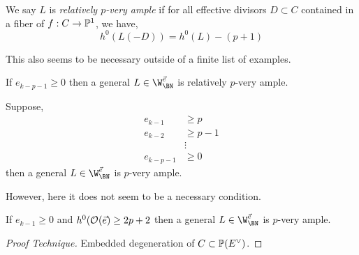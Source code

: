 \documentclass[12pt]{article}
\begin{document}
\begin{defn}
We say $L$ is \textit{relatively $p$-very ample} if for all effective divisors $D \subset C$ contained in a fiber of $f : C \to \P^1$, we have,
\[ h^0(L(-D)) = h^0(L) - (p+1) \]
\end{defn}

\begin{rmk}
This also seems to be necessary outside of a finite list of examples.
\end{rmk}

\begin{theorem}
If $e_{k-p-1} \ge 0$ then a general $L \in \W_{\BN}^{\vec{e}}$ is relatively $p$-very ample. 
\end{theorem}

\begin{cor}
Suppose,
\begin{align*}
e_{k-1} & \ge p
\\
e_{k-2} & \ge p-1
\\
& \vdots
\\
e_{k-p-1} & \ge 0
\end{align*}
then a general $L \in \W^{\vec{e}}_{\BN}$ is $p$-very ample. 
\end{cor}

\begin{rmk}
However, here it does not seem to be a necessary condition.
\end{rmk}

\begin{conj}
If $e_{k-1} \ge 0$ and $h^0(\struct{}(\vec{e}) \ge 2 p + 2$ then a general $L \in \W^{\vec{e}}_{\BN}$ is $p$-very ample. 
\end{conj}

\begin{proof}[Proof Technique]
Embedded degeneration of $C \subset \P(E^\vee)$. 
\end{proof}
\end{document}
